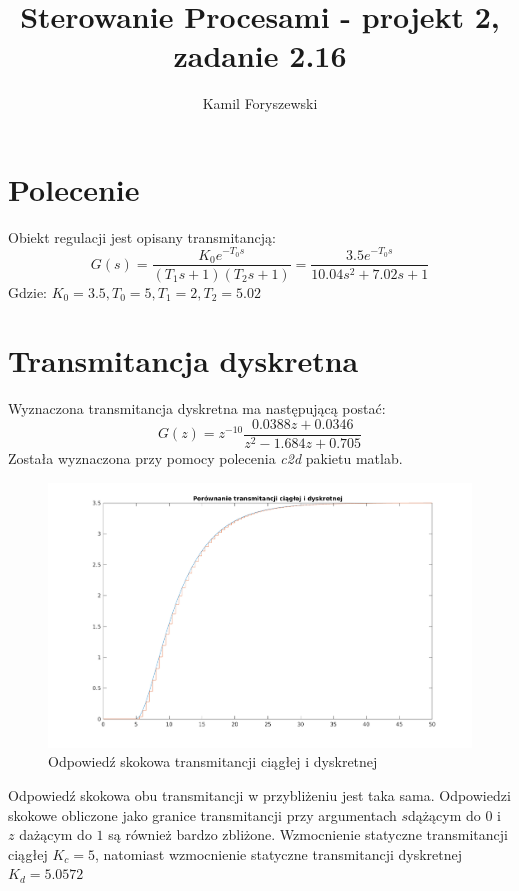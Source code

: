 \documentclass[a4paper, 11pt]{article}
\author{Kamil Foryszewski}
\title{Sterowanie Procesami - projekt 2, zadanie 2.16}
\begin{document}

\maketitle
\tableofcontents

\section{Polecenie}
Obiekt regulacji jest opisany transmitancją: 
$$G(s) = \frac{K_0e^{-T_0s}}{(T_1s + 1)(T_2s+1)}  = \frac{3.5e^{-T_0s}}{10.04s^2+7.02s +1}  $$
Gdzie: 
$K_0 = 3.5, T_0 = 5, T_1 = 2, T_2 = 5.02$

\section{Transmitancja dyskretna}
Wyznaczona transmitancja dyskretna ma następującą postać: 
$$G(z) = z^{-10}\frac{0.0388z+0.0346}{z^2-1.684z+0.705}$$
Została wyznaczona przy pomocy polecenia \emph{c2d} pakietu matlab. 
\begin{figure}[htp]
\centering
\includegraphics[scale=0.6]{1_1.png}
\caption{Odpowiedź skokowa transmitancji ciągłej i dyskretnej}
\label{}
\end{figure}%
Odpowiedź skokowa obu transmitancji w przybliżeniu jest taka sama. Odpowiedzi skokowe obliczone jako granice transmitancji przy argumentach $s$dążącym do $0$ i $z$ dażącym do $1$ są również bardzo zbliżone. Wzmocnienie statyczne transmitancji ciągłej $K_c = 5$, natomiast wzmocnienie statyczne transmitancji dyskretnej $K_d = 5.0572$
\label{3}
\end{document}
